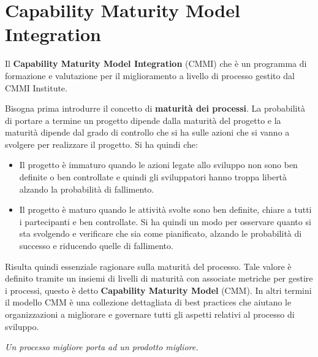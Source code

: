 \chapter{Capability Maturity Model Integration}
Il \textbf{Capability Maturity Model Integration} (CMMI) che è un programma di formazione e valutazione per il miglioramento a livello di processo gestito dal CMMI Institute.

Bisogna prima introdurre il concetto di \textbf{maturità dei processi}. La probabilità di portare a termine un progetto dipende dalla maturità del progetto e la maturità dipende dal grado di controllo che si ha sulle azioni che si vanno a svolgere per realizzare il progetto. Si ha quindi che:
\begin{itemize}
    \item Il progetto è immaturo quando le azioni legate allo sviluppo non sono ben definite o ben controllate e quindi gli sviluppatori hanno troppa libertà alzando la probabilità di fallimento.
    \item Il progetto è maturo quando le attività svolte sono ben definite, chiare a tutti i partecipanti e ben controllate. Si ha quindi un modo per osservare quanto si sta svolgendo e verificare che sia come pianificato, alzando le probabilità di successo e riducendo quelle di fallimento.
\end{itemize}

Risulta quindi essenziale ragionare sulla maturità del processo. Tale valore è definito tramite un insiemi di livelli di maturità con associate metriche per gestire i processi, questo è detto \textbf{Capability Maturity Model} (CMM). In altri termini il modello CMM è una collezione dettagliata di best practices che aiutano le organizzazioni a migliorare e governare tutti gli aspetti relativi al processo di sviluppo.
\begin{center}
    \textit{Un processo migliore porta ad un prodotto migliore.}
\end{center}


